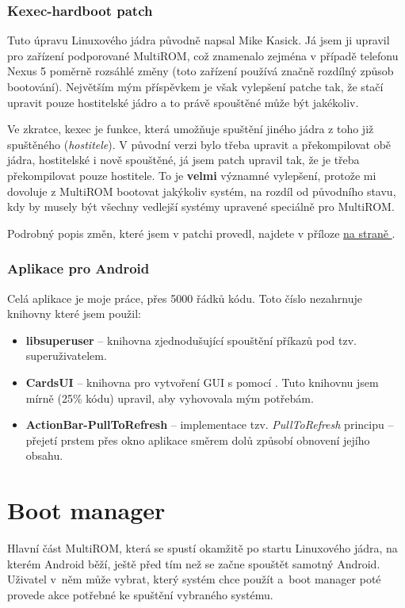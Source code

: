 \documentclass[12pt, a4paper, oneside]{article}
\newcommand{\B}{\textbf} %
\newcommand{\It}{\textit}  %
\newcommand*{\attref}[1]{\hyperref[{#1}]{\uv{\nameref*{#1}} na straně \pageref{#1}}}
\begin{document}
\subsubsection{Kexec-hardboot patch}
Tuto úpravu Linuxového jádra původně napsal Mike Kasick\cite{kexec-hardboot-orig}. Já jsem ji upravil pro zařízení podporované MultiROM, což znamenalo zejména v případě telefonu Nexus 5 poměrně rozsáhlé změny (toto zařízení používá značně rozdílný způsob bootování). Největším mým příspěvkem je však vylepšení patche tak, že stačí upravit pouze hostitelské jádro a to právě spouštěné může být jakékoliv.

Ve zkratce, kexec je funkce, která umožňuje spuštění jiného jádra z toho již spuštěného (\It{hostitele}). V původní verzi bylo třeba upravit a překompilovat obě jádra, hostitelské i nově spouštěné, já jsem patch upravil tak, že je třeba překompilovat pouze hostitele. To je \B{velmi} významné vylepšení, protože mi dovoluje z MultiROM bootovat jakýkoliv systém, na rozdíl od původního stavu, kdy by musely být všechny vedlejší systémy upravené speciálně pro MultiROM.

Podrobný popis změn, které jsem v patchi provedl, najdete v příloze \attref{sec:kexec-hardboot}.

\subsubsection{Aplikace pro Android}
Celá aplikace je moje práce, přes 5000 řádků kódu. Toto číslo nezahrnuje knihovny které jsem použil:
\begin{itemize}
    \item \B{libsuperuser} -- knihovna zjednodušující spouštění příkazů pod tzv. superuživatelem.
    \item \B{CardsUI} -- knihovna pro vytvoření GUI s pomocí . Tuto knihovnu jsem mírně (25\% kódu) upravil, aby vyhovovala mým potřebám.
    \item \B{ActionBar-PullToRefresh} -- implementace tzv. \It{PullToRefresh} principu -- přejetí prstem přes okno aplikace směrem dolů způsobí obnovení jejího obsahu.
\end{itemize}

\newpage
\section{Boot manager}
Hlavní část MultiROM, která se spustí okamžitě po startu Linuxového jádra, na kterém Android běží, ještě před tím než se začne spouštět samotný Android. Uživatel v~něm může vybrat, který systém chce použít a~boot manager poté provede akce potřebné ke spuštění vybraného systému.
\end{document}
